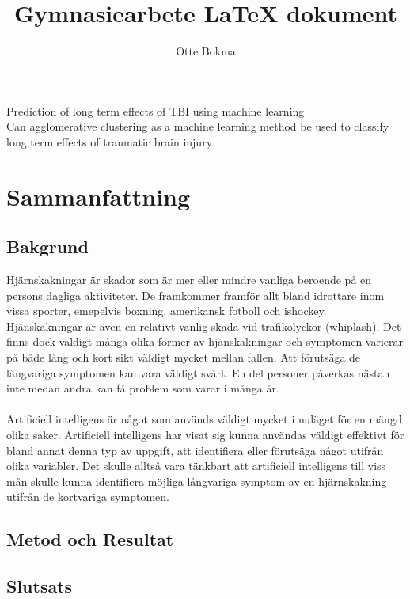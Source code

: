 \documentclass[11pt]{article}
\title{Gymnasiearbete {\LaTeX} dokument}
\author{Otte Bokma}
\begin{document}
\begin{titlepage}

  \begin{center}
    \huge{Prediction of long term effects of TBI using machine learning}
    \\[1cm]
    \large{Can agglomerative clustering as a machine learning method be used to classify long term effects of traumatic brain injury}
  \end{center}
\end{titlepage}

\section*{Sammanfattning}

\subsection*{Bakgrund}

Hjärnskakningar är skador som är mer eller mindre vanliga beroende på en persons dagliga aktiviteter. De framkommer framför allt bland idrottare inom vissa sporter, emepelvis boxning, amerikansk fotboll och ishockey. Hjänskakningar är även en relativt vanlig skada vid trafikolyckor (whiplash). Det finns dock väldigt många olika former av hjänskakningar och symptomen varierar på både lång och kort sikt väldigt mycket mellan fallen. Att förutsäga de långvariga symptomen kan vara väldigt svårt. En del personer påverkas nästan inte medan andra kan få problem som varar i många år.\\
\\
Artificiell intelligens är något som används väldigt mycket i nuläget för en mängd olika saker. Artificiell intelligens har visat sig kunna användas väldigt effektivt för bland annat denna typ av uppgift, att identifiera eller förutsäga något utifrån olika variabler. Det skulle alltså vara tänkbart att artificiell intelligens till viss mån skulle kunna identifiera möjliga långvariga symptom av en hjärnskakning utifrån de kortvariga symptomen.

\subsection*{Metod och Resultat}

\subsection*{Slutsats}
\end{document}
